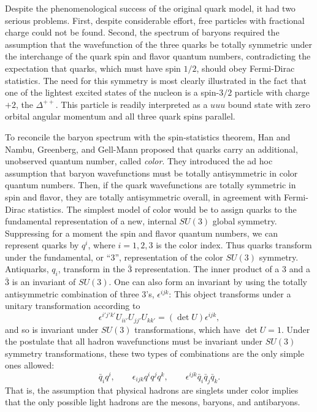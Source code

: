 Despite the phenomenological success of the original quark model, it had two
serious problems.  First, despite considerable effort, free particles with
fractional charge could not be found.  Second, the spectrum of baryons
required the assumption that the wavefunction of the three quarks be totally
symmetric under the interchange of the quark spin and flavor quantum numbers,
contradicting the expectation that quarks, which must have spin $1/2$, should
obey Fermi-Dirac statistics.  The need for this symmetry is most clearly
illustrated in the fact that one of the lightest excited states of the nucleon
is a spin-$3/2$ particle with charge $+2$, the $\Delta^{++}$.  This particle is
readily interpreted as a $uuu$ bound state with zero orbital angular momentum
and all three quark spins parallel.

To reconcile the baryon spectrum with the spin-statistics theorem, Han and
Nambu, Greenberg, and Gell-Mann proposed that quarks carry an additional,
unobserved quantum number, called \emph{color}.  They introduced the ad hoc
assumption that baryon wavefunctions must be totally antisymmetric in color
quantum numbers.  Then, if the quark wavefunctions are totally symmetric in
spin and flavor, they are totally antisymmetric overall, in agreement with
Fermi-Dirac statistics.  The simplest model of color would be to assign quarks
to the fundamental representation of a new, internal $SU(3)$ global symmetry.
Suppressing for a moment the spin and flavor quantum numbers, we can
represent quarks by $q^i$, where $i = 1, 2, 3$ is the color index.  Thus
quarks transform under the fundamental, or ``3'', representation of the color
$SU(3)$ symmetry.  Antiquarks, $q_i$, transform in the $\bar{3}$
representation.  The inner product of a 3 and a $\bar{3}$ is an invariant of
$SU(3)$.  One can also form an invariant by using the totally antisymmetric
combination of three 3's, $\epsilon^{ijk}$: This object transforms under a
unitary transformation according to
\begin{equation}
  \epsilon^{i'j'k'}U_{ii'}U_{jj'}U_{kk'} = (\det U)\epsilon^{ijk} ,
  \label{eq:17.2}
\end{equation}
and so is invariant under $SU(3)$ transformations, which have $\det U = 1$.
Under the postulate that all hadron wavefunctions must be invariant under
$SU(3)$ symmetry transformations, these two types of combinations are the
only simple ones allowed:
\begin{equation}
  \bar{q}_i q^i,\qquad \epsilon_{ijk}q^i q^j q^k,\qquad
  \epsilon^{ijk}\bar{q}_i\bar{q}_j\bar{q}_k .
  \label{eq:17.3}
\end{equation}
That is, the assumption that physical hadrons are singlets under color
implies that the only possible light hadrons are the mesons, baryons, and
antibaryons.

